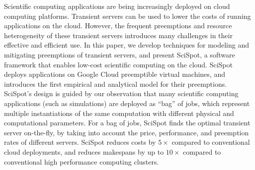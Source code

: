 Scientific computing applications are being increasingly deployed on cloud computing platforms.
Transient servers can be used to lower the costs of running applications on the cloud.
However, the frequent preemptions and resource heterogeneity of these transient servers introduces many challenges in their effective and efficient use.
%
In this paper, we develop techniques for modeling and mitigating preemptions of transient servers, and present SciSpot, a software framework that enables low-cost scientific computing on the cloud. 
%
SciSpot deploys applications on Google Cloud preemptible virtual machines, and introduces the first empirical and analytical model for their preemptions. 
SciSpot's design is guided by our observation that many scientific computing applications (such as simulations) are deployed as ``bag'' of jobs, which represent multiple instantiations of the same computation with different physical and computational parameters. 
For a bag of jobs, SciSpot finds the optimal transient server on-the-fly, by taking into account the price, performance, and preemption rates of different servers. 
SciSpot reduces costs by $5\times$ compared to conventional cloud deployments, and reduces  makespans by up to $10\times$ compared to conventional high performance computing clusters.


%






